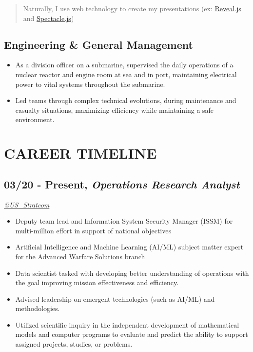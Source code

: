 \documentclass[10pt]{article}
\def\tightlist{}
\begin{document}
\begin{quote}
Naturally, I use web technology to create my presentations (ex:
\href{https://revealjs.com/\#/}{Reveal.js} and
\href{https://formidable.com/open-source/spectacle/}{Spectacle.js})
\end{quote}

\hypertarget{engineering-general-management}{%
\subsection{Engineering \& General
Management}\label{engineering-general-management}}

\begin{itemize}
\tightlist
\item
  As a division officer on a submarine, supervised the daily operations
  of a nuclear reactor and engine room at sea and in port, maintaining
  electrical power to vital systems throughout the submarine.
\item
  Led teams through complex technical evolutions, during maintenance and
  casualty situations, maximizing efficiency while maintaining a safe
  environment.
\end{itemize}

\hypertarget{career-timeline}{%
\section{CAREER TIMELINE}\label{career-timeline}}

\hypertarget{present-operations-research-analyst}{%
\subsection{\texorpdfstring{03/20 - Present, \textbf{\emph{Operations
Research
Analyst}}}{03/20 - Present, Operations Research Analyst}}\label{present-operations-research-analyst}}

\emph{\href{https://twitter.com/US_Stratcom}{@US\_Stratcom}}

\begin{itemize}
\tightlist
\item
  Deputy team lead and Information System Security Manager (ISSM) for
  multi-million effort in support of national objectives
\item
  Artificial Intelligence and Machine Learning (AI/ML) subject matter
  expert for the Advanced Warfare Solutions branch
\item
  Data scientist tasked with developing better understanding of
  operations with the goal improving mission effectiveness and
  efficiency.
\item
  Advised leadership on emergent technologies (such as AI/ML) and
  methodologies.
\item
  Utilized scientific inquiry in the independent development of
  mathematical models and computer programs to evaluate and predict the
  ability to support assigned projects, studies, or problems.
\end{itemize}
\end{document}
